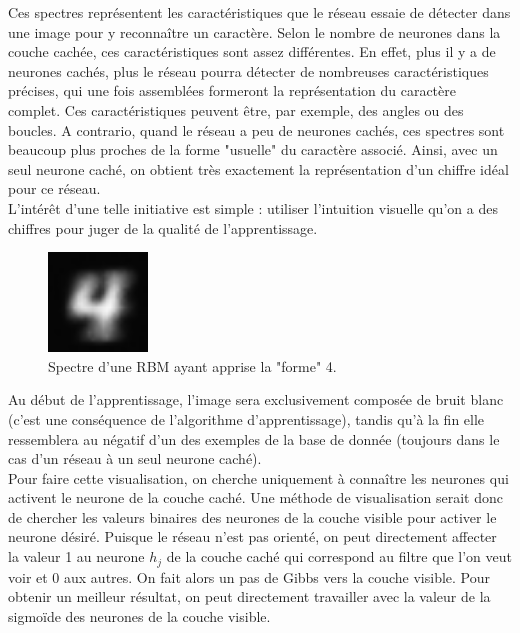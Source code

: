 \documentclass[a4paper,oneside]{report}
\begin{document}
                Ces spectres représentent les caractéristiques que le réseau essaie de détecter dans 
une image pour y reconnaître un caractère. Selon le nombre de neurones dans la couche 
cachée, ces caractéristiques 
sont assez différentes. En effet, plus il y a de neurones cachés, plus le réseau pourra détecter de 
nombreuses caractéristiques précises, qui une fois assemblées formeront la représentation du 
caractère complet. Ces caractéristiques peuvent être, par exemple, des angles ou des boucles. A 
contrario, quand le réseau a peu de neurones cachés, ces spectres sont beaucoup plus proches de la 
forme 
"usuelle" du caractère associé. Ainsi, avec un seul neurone caché, on obtient très exactement la 
représentation d'un chiffre idéal pour ce réseau.\\

                L'intérêt d'une telle initiative est simple : utiliser l'intuition visuelle qu'on a 
des chiffres pour juger de la qualité de l'apprentissage.

                \begin{figure}
                    \begin{center}
                        \includegraphics[width=75pt]{Images/spectres-01.png}
                    \end{center}
                    \caption{Spectre d'une RBM ayant apprise la "forme" 4.}
                \end{figure}

                Au début de l'apprentissage, l'image sera exclusivement composée de bruit blanc (c'est 
une conséquence de l'algorithme d'apprentissage), tandis qu'à la fin elle ressemblera 
au négatif d'un des 
exemples de la base de donnée (toujours dans le cas d'un réseau à un seul neurone caché).\\

Pour faire cette visualisation, on cherche uniquement à connaître les neurones qui activent le neurone de la couche caché. 
Une méthode de visualisation serait donc de chercher les valeurs binaires  des neurones de la couche visible pour 
activer le neurone désiré. Puisque le réseau n'est pas orienté, on peut directement affecter la valeur 1 au neurone \textit{$h_{j}$} 
de la couche caché qui correspond au filtre que l'on veut voir et 0 aux autres. On fait alors un pas de Gibbs vers la couche visible. Pour obtenir un meilleur résultat, 
on peut directement travailler avec la valeur de la sigmoïde des neurones de la couche visible.
\end{document}
